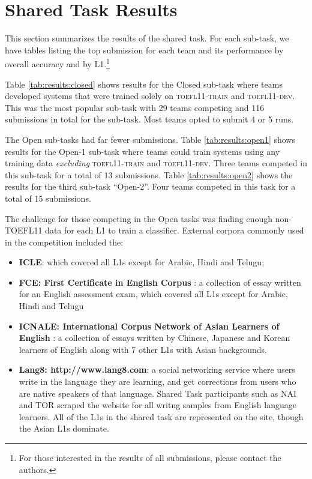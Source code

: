 \documentclass[11pt,letterpaper]{article}
\begin{document}
\section{Shared Task Results}
\label{sec-results}
This section summarizes the results of the shared task.  For each sub-task,
we have tables listing the top submission for each team and its performance by overall
accuracy and by L1.\footnote{For those interested in
the results of all submissions, please contact the authors.}

Table \ref{tab:results:closed} shows results for the Closed sub-task where teams
developed systems that were trained solely on \textsc{toefl11-train} and \textsc{toefl11-dev}.  This
was the most popular sub-task with 29 teams competing and 116 submissions in total
for the sub-task.  Most teams opted to submit 4 or 5 runs.



The Open sub-tasks had far fewer submissions.  Table \ref{tab:results:open1} shows
results for the Open-1 sub-task where teams could train systems using any training
data {\it excluding} \textsc{toefl11-train} and \textsc{toefl11-dev}.  Three teams competed in this
sub-task for a total of 13 submissions.  Table \ref{tab:results:open2} shows the results for the third sub-task ``Open-2''.  Four
teams competed in this task for a total of 15 submissions.

The challenge for those
competing in the Open tasks was finding enough non-\textsc{TOEFL11} data for each L1
to train a classifier.  External corpora commonly used in the competition included
the:



\begin{itemize}
\item {\bf ICLE}: which covered all L1s except for Arabic, Hindi and Telugu;
\item {\bf FCE: First Certificate in English Corpus} \cite{yannakoudakis-briscoe-medlock:2011:ACL-HLT2011}: a collection
of essay written for an English assessment exam, which covered all L1s except for Arabic, Hindi and Telugu
\item {\bf ICNALE: International Corpus Network of Asian Learners of English} \cite{Ishikawa:2011}: a collection of essays
written by Chinese, Japanese and Korean learners of English along with 7 other L1s with Asian backgrounds.
\item {\bf Lang8: http://www.lang8.com}: a social networking service where users write in the
language they are learning, and get corrections from users who are native speakers of that language. Shared Task
participants such as NAI and TOR scraped the website for all writng samples from English language learners.
All of the L1s in the shared task are represented on the site, though the Asian L1s
dominate.
\end{itemize}
\end{document}
